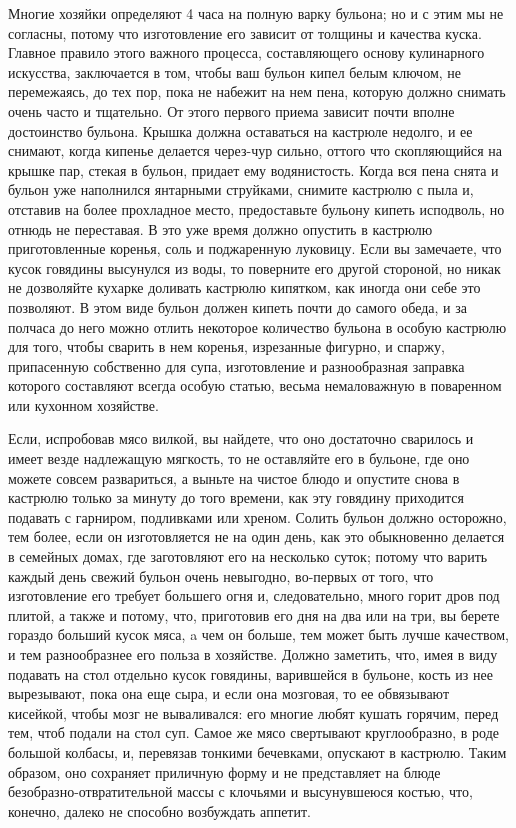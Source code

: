 Многие хозяйки определяют 4 часа на полную варку бульона; но и с этим мы не согласны, потому что изготовление его зависит от толщины и качества куска. Главное правило этого важного процесса, составляющего основу кулинарного искусства, заключается в том, чтобы ваш бульон кипел белым ключом, не перемежаясь, до тех пор, пока не набежит на нем пена, которую должно снимать очень часто и тщательно. От этого первого приема зависит почти вполне достоинство бульона. Крышка должна оставаться на кастрюле недолго, и ее снимают, когда кипенье делается через-чур сильно, оттого что скопляющийся на крышке пар, стекая в бульон, придает ему водянистость. Когда вся пена снята и бульон уже наполнился янтарными струйками, снимите кастрюлю с пыла и, отставив на более прохладное место, предоставьте бульону кипеть исподволь, но отнюдь не переставая. В это уже время должно опустить в кастрюлю приготовленные коренья, соль и поджаренную луковицу. Если вы замечаете, что кусок говядины высунулся из воды, то поверните его другой стороной, но никак не дозволяйте кухарке доливать кастрюлю кипятком, как иногда они себе это позволяют. В этом виде бульон должен кипеть почти до самого обеда, и за полчаса до него можно отлить некоторое количество бульона в особую кастрюлю для того, чтобы сварить в нем коренья, изрезанные фигурно, и спаржу, припасенную собственно для супа, изготовление и разнообразная заправка которого составляют всегда особую статью, весьма немаловажную в поваренном или кухонном хозяйстве.

Если, испробовав мясо вилкой, вы найдете, что оно достаточно сварилось и имеет везде надлежащую мягкость, то не оставляйте его в бульоне, где оно можете совсем развариться, а выньте на чистое блюдо и опустите снова в кастрюлю только за минуту до того времени, как эту говядину приходится подавать с гарниром, подливками или хреном. Солить бульон должно осторожно, тем более, если он изготовляется не на один день, как это обыкновенно делается в семейных домах, где заготовляют его на несколько суток; потому что варить каждый день свежий бульон очень невыгодно, во-первых от того, что изготовление его требует большего огня и, следовательно, много горит дров под плитой, а также и потому, что, приготовив его дня на два или на три, вы берете гораздо больший кусок мяса, a чем он больше, тем может быть лучше качеством, и тем разнообразнее его польза в хозяйстве. Должно заметить, что, имея в виду подавать на стол отдельно кусок говядины, варившейся в бульоне, кость из нее вырезывают, пока она еще сыра, и если она мозговая, то ее обвязывают кисейкой, чтобы мозг не вываливался: его многие любят кушать горячим, перед тем, чтоб подали на стол суп. Самое же мясо свертывают круглообразно, в роде большой колбасы, и, перевязав тонкими бечевками, опускают в кастрюлю. Таким образом, оно сохраняет приличную форму и не представляет на блюде безобразно-отвратительной массы с клочьями и высунувшеюся костью, что, конечно, далеко не способно возбуждать аппетит.

